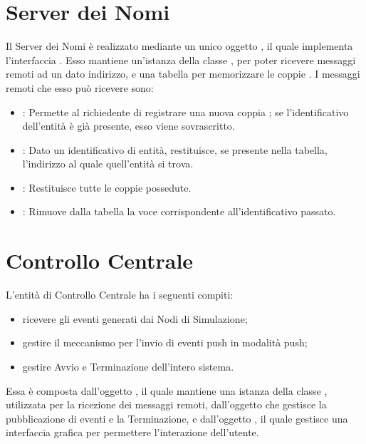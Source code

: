 	\section{Server dei Nomi}
	
	Il Server dei Nomi è realizzato mediante un unico oggetto  , il quale implementa l'interfaccia . Esso mantiene un'istanza della classe , per poter ricevere messaggi remoti ad un dato indirizzo, e una tabella per memorizzare le coppie . I messaggi remoti che esso può ricevere sono:
	\begin{itemize}
		\item {}: Permette al richiedente di registrare una nuova coppia ; se l'identificativo dell'entità è già presente, esso viene sovrascritto.
		\item {}: Dato un identificativo di entità, restituisce, se presente nella tabella, l'indirizzo al quale quell'entità si trova.
		\item {}: Restituisce tutte le coppie  possedute.
		\item {}: Rimuove dalla tabella la voce corrispondente all'identificativo passato.
	\end{itemize}
	
	\section{Controllo Centrale}
	
	L'entità di Controllo Centrale ha i seguenti compiti:
	
	\begin{itemize}
		\item ricevere gli eventi generati dai Nodi di Simulazione;
		\item gestire il meccanismo  per l'invio di eventi push in modalità push;
		\item gestire Avvio e Terminazione dell'intero sistema.
	\end{itemize}
	
	Essa è composta dall'oggetto , il quale mantiene una istanza della classe , utilizzata per la ricezione dei messaggi remoti, dall'oggetto   che gestisce la pubblicazione di eventi e la Terminazione, e dall'oggetto , il quale gestisce una interfaccia grafica per permettere l'interazione dell'utente.
	
